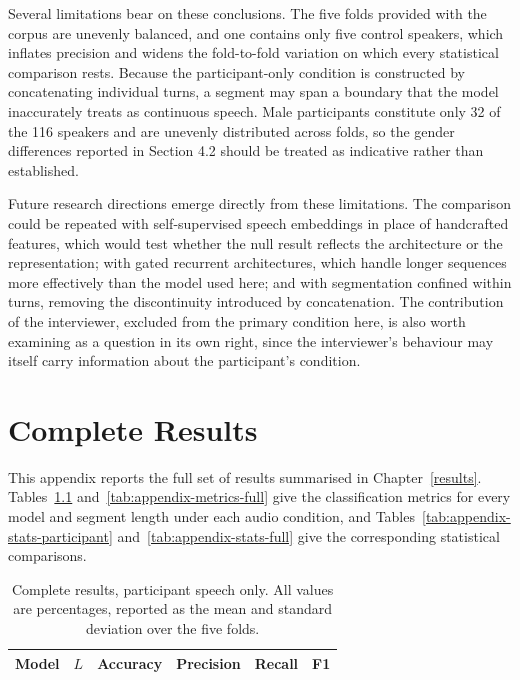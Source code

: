 \documentclass{mproj}
\begin{document}
Several limitations bear on these conclusions. The five folds provided with the corpus are unevenly balanced, and one contains only five control speakers, which inflates precision and widens the fold-to-fold variation on which every statistical comparison rests. Because the participant-only condition is constructed by concatenating individual turns, a segment may span a boundary that the model inaccurately treats as continuous speech. Male participants constitute only 32 of the 116 speakers and are unevenly distributed across folds, so the gender differences reported in Section 4.2 should be treated as indicative rather than established.

Future research directions emerge directly from these limitations. The comparison could be repeated with self-supervised speech embeddings in place of handcrafted features, which would test whether the null result reflects the architecture or the representation; with gated recurrent architectures, which handle longer sequences more effectively than the model used here; and with segmentation confined within turns, removing the discontinuity introduced by concatenation. The contribution of the interviewer, excluded from the primary condition here, is also worth examining as a question in its own right, since the interviewer's behaviour may itself carry information about the participant's condition.

\appendix %
\chapter{Complete Results}\label{app:full-results}

This appendix reports the full set of results summarised in Chapter~\ref{results}. Tables~\ref{tab:appendix-metrics-participant} and~\ref{tab:appendix-metrics-full} give the classification metrics for every model and segment length under each audio condition, and Tables~\ref{tab:appendix-stats-participant} and~\ref{tab:appendix-stats-full} give the corresponding statistical comparisons.

\begin{table}[htbp]
  \centering
  \caption{Complete results, participant speech only. All values are
  percentages, reported as the mean and standard deviation over the five folds.}
  \label{tab:appendix-metrics-participant}
  \begin{tabular}{llcccc}
    \toprule
    Model & $L$ & Accuracy & Precision & Recall & F1 \\
    \midrule
    \bottomrule
  \end{tabular}
\end{table}
\end{document}
